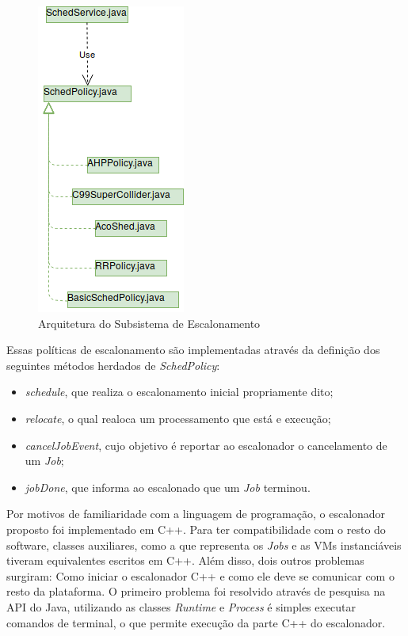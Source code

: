 \begin{figure}[htbp]
	\centerline{\includegraphics[scale=0.7]{img/ArquiteturaAntes.png}}
	\caption{Arquitetura do Subsistema de Escalonamento}
	\label{ArquiteturaAtual}
\end{figure}

Essas políticas de escalonamento são implementadas através da definição dos seguintes métodos herdados de \textit{SchedPolicy}:
\begin{itemize}
	\item \textit{schedule}, que realiza o escalonamento inicial propriamente dito;
	\item \textit{relocate}, o qual realoca um processamento que está e execução;
	\item \textit{cancelJobEvent}, cujo objetivo é reportar ao escalonador o cancelamento de um \textit{Job};
	\item \textit{jobDone}, que informa ao escalonado que um \textit{Job} terminou.
\end{itemize}


Por motivos de familiaridade com a linguagem de programação, o escalonador proposto foi implementado em C++. Para ter compatibilidade com o resto do software, classes auxiliares, como a que representa os \textit{Jobs} e as \acrshort{VM}s instanciáveis tiveram equivalentes escritos em C++. Além disso, dois outros problemas surgiram: Como iniciar o escalonador C++ e como ele deve se comunicar com o resto da plataforma. O primeiro problema foi resolvido através de pesquisa na \acrfull{API} do Java, utilizando as classes \textit{Runtime}\cite{JavaRuntime} e \textit{Process}\cite{JavaProcess} é simples executar comandos de terminal, o que permite execução da parte C++ do escalonador.

